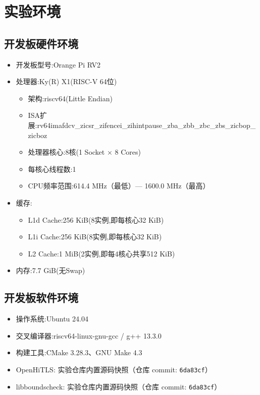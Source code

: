 \section{实验环境}

\subsection{开发板硬件环境}
\begin{itemize}
    \item 开发板型号:Orange Pi RV2
    \item 处理器:Ky(R) X1(RISC-V 64位)
    \begin{itemize}
        \item 架构:riscv64(Little Endian)
        \item ISA扩展:rv64imafdcv\_zicsr\_zifencei\_zihintpause\_zba\_zbb\_zbc\_zbs\_zicbop\_zicboz
        \item 处理器核心:8核(1 Socket × 8 Cores)
        \item 每核心线程数:1
        \item CPU频率范围:614.4 MHz（最低）— 1600.0 MHz（最高）
    \end{itemize}
    \item 缓存:
    \begin{itemize}
        \item L1d Cache:256 KiB(8实例,即每核心32 KiB)
        \item L1i Cache:256 KiB(8实例,即每核心32 KiB)
        \item L2 Cache:1 MiB(2实例,即每4核心共享512 KiB)
    \end{itemize}
    \item 内存:7.7 GiB(无Swap)
\end{itemize}

\subsection{开发板软件环境}
\begin{itemize}
    \item 操作系统:Ubuntu 24.04
    \item 交叉编译器:riscv64-linux-gnu-gcc / g++ 13.3.0
    \item 构建工具:CMake 3.28.3、GNU Make 4.3
    \item OpenHiTLS: 实验仓库内置源码快照（仓库 commit: \texttt{6da83cf}） 
    \item libboundscheck: 实验仓库内置源码快照（仓库 commit: \texttt{6da83cf}）
\end{itemize}

